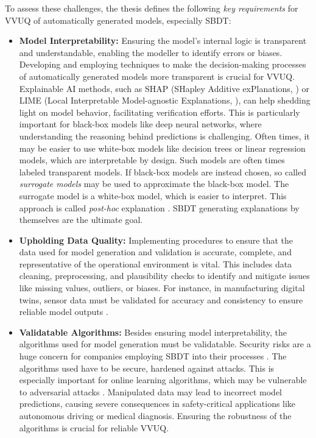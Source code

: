 To assess these challenges, the thesis defines the following \textit{key requirements} for VVUQ of automatically generated models, especially SBDT:
\begin{itemize}
  \item \textbf{Model Interpretability:} \label{par:surrogate} Ensuring the model's internal logic is transparent and understandable, enabling the modeller to identify errors or biases. Developing and employing techniques to make the decision-making processes of automatically generated models more transparent is crucial for VVUQ. Explainable AI methods, such as SHAP (SHapley Additive exPlanations, \autocite{lundberg2017unified}) or LIME (Local Interpretable Model-agnostic Explanations, \autocite{ribeiro2016should}), can help shedding light on model behavior, facilitating verification efforts. This is particularly important for black-box models like deep neural networks, where understanding the reasoning behind predictions is challenging. Often times, it may be easier to use white-box models like decision trees or linear regression models, which are interpretable by design. Such models are often times labeled transparent models. If black-box models are instead chosen, so called \textit{surrogate models} may be used to approximate the black-box model. The surrogate model is a white-box model, which is easier to interpret. This approach is called \textit{post-hoc} explanation \autocite{fischer2024demystifying}. SBDT generating explanations by themselves are the ultimate goal.
  \item \textbf{Upholding Data Quality:} Implementing procedures to ensure that the data used for model generation and validation is accurate, complete, and representative of the operational environment is vital. This includes data cleaning, preprocessing, and plausibility checks to identify and mitigate issues like missing values, outliers, or biases. For instance, in manufacturing digital twins, sensor data must be validated for accuracy and consistency to ensure reliable model outputs \autocite{rodriguez2023updating}.
  \item \textbf{Validatable Algorithms:} Besides ensuring model interpretability, the algorithms used for model generation must be validatable. Security risks are a huge concern for companies employing SBDT into their processes \autocite{alcaraz2022digital}. The algorithms used have to be secure, hardened against attacks. This is especially important for online learning algorithms, which may be vulnerable to adversarial attacks \autocite{balta2023digital}. Manipulated data may lead to incorrect model predictions, causing severe consequences in safety-critical applications like autonomous driving or medical diagnosis. Ensuring the robustness of the algorithms is crucial for reliable VVUQ.

\end{itemize}

